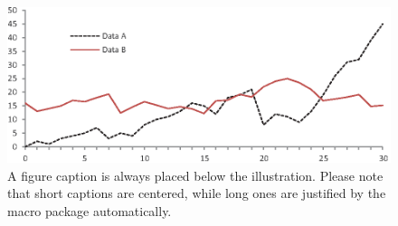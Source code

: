 \begin{figure}[tbh!]
\includegraphics[width=\textwidth]{fig1.eps}
\caption{A figure caption is always placed below the illustration.
Please note that short captions are centered, while long ones are
justified by the macro package automatically.} \label{fig1}
\end{figure}

